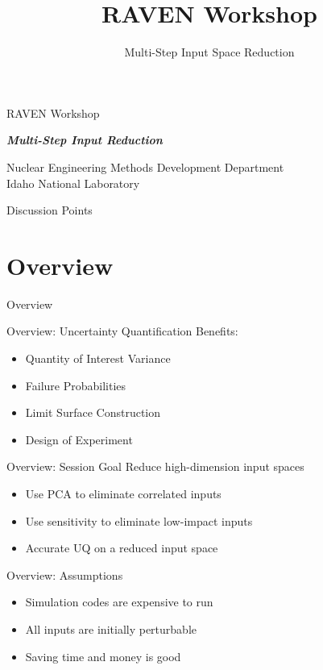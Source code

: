 \documentclass[t,9pt,svgnames]{beamer}
\makeatletter
\newcommand{\mytoc}{\@starttoc{toc}}
\makeatother
\begin{document}
\title[RAVEN Workshop]{RAVEN Workshop}
\subtitle{Multi-Step Input Space Reduction}

\begin{titleframe}{RAVEN Workshop}

{\bfseries\emph{Multi-Step Input Reduction}}

\vfill
{\small Nuclear Engineering Methods Development Department\\
Idaho National Laboratory}
\end{titleframe}

\begin{frame}{Discussion Points}
\mytoc
\end{frame}

\section{Overview}
\begin{frame}{Overview}
\end{frame}

\begin{frame}{Overview: Uncertainty Quantification}
  Benefits:
  \begin{itemize}
    \item Quantity of Interest Variance
    \item Failure Probabilities
    \item Limit Surface Construction
    \item Design of Experiment
  \end{itemize}
\end{frame}

\begin{frame}{Overview: Session Goal}
  Reduce high-dimension input spaces
  \begin{itemize}
    \item Use PCA to eliminate correlated inputs
    \item Use sensitivity to eliminate low-impact inputs
    \item Accurate UQ on a reduced input space
  \end{itemize}
\end{frame}

\begin{frame}{Overview: Assumptions}
  \begin{itemize}
    \item Simulation codes are expensive to run
    \item All inputs are initially perturbable
    \item Saving time and money is good
  \end{itemize}
\end{frame}
\end{document}
